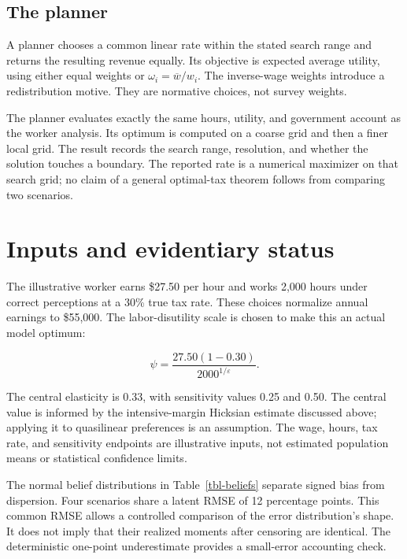 \documentclass[
  11pt,
  letterpaper,
  DIV=11,
  numbers=noendperiod]{scrartcl}
\begin{document}
\subsection{The planner}\label{the-planner}

A planner chooses a common linear rate within the stated search range
and returns the resulting revenue equally. Its objective is expected
average utility, using either equal weights or
\(\omega_i=\overline w/w_i\). The inverse-wage weights introduce a
redistribution motive. They are normative choices, not survey weights.

The planner evaluates exactly the same hours, utility, and government
account as the worker analysis. Its optimum is computed on a coarse grid
and then a finer local grid. The result records the search range,
resolution, and whether the solution touches a boundary. The reported
rate is a numerical maximizer on that search grid; no claim of a general
optimal-tax theorem follows from comparing two scenarios.

\section{Inputs and evidentiary
status}\label{inputs-and-evidentiary-status}

The illustrative worker earns \$27.50 per hour and works 2,000 hours
under correct perceptions at a 30\% true tax rate. These choices
normalize annual earnings to \$55,000. The labor-disutility scale is
chosen to make this an actual model optimum:

\[\psi=\frac{27.50(1-0.30)}{2000^{1/\varepsilon}}.\]

The central elasticity is 0.33, with sensitivity values 0.25 and 0.50.
The central value is informed by the intensive-margin Hicksian estimate
discussed above; applying it to quasilinear preferences is an
assumption. The wage, hours, tax rate, and sensitivity endpoints are
illustrative inputs, not estimated population means or statistical
confidence limits.

The normal belief distributions in Table~\ref{tbl-beliefs} separate
signed bias from dispersion. Four scenarios share a latent RMSE of 12
percentage points. This common RMSE allows a controlled comparison of
the error distribution's shape. It does not imply that their realized
moments after censoring are identical. The deterministic one-point
underestimate provides a small-error accounting check.
\end{document}
